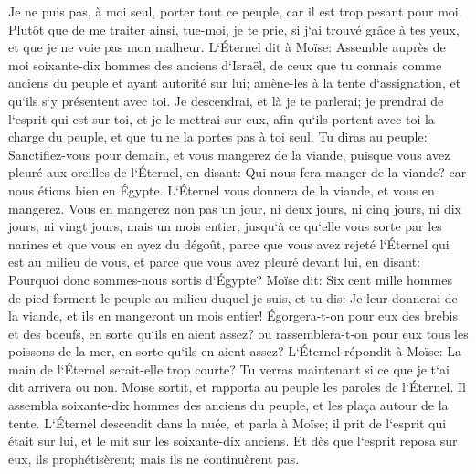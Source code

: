 \verse Je ne puis pas, à moi seul, porter tout ce peuple, car il est trop pesant pour moi. 
\verse Plutôt que de me traiter ainsi, tue-moi, je te prie, si j`ai trouvé grâce à tes yeux, et que je ne voie pas mon malheur. 
\verse L`Éternel dit à Moïse: Assemble auprès de moi soixante-dix hommes des anciens d`Israël, de ceux que tu connais comme anciens du peuple et ayant autorité sur lui; amène-les à la tente d`assignation, et qu`ils s`y présentent avec toi. 
\verse Je descendrai, et là je te parlerai; je prendrai de l`esprit qui est sur toi, et je le mettrai sur eux, afin qu`ils portent avec toi la charge du peuple, et que tu ne la portes pas à toi seul. 
\verse Tu diras au peuple: Sanctifiez-vous pour demain, et vous mangerez de la viande, puisque vous avez pleuré aux oreilles de l`Éternel, en disant: Qui nous fera manger de la viande? car nous étions bien en Égypte. L`Éternel vous donnera de la viande, et vous en mangerez. 
\verse Vous en mangerez non pas un jour, ni deux jours, ni cinq jours, ni dix jours, ni vingt jours, 
\verse mais un mois entier, jusqu`à ce qu`elle vous sorte par les narines et que vous en ayez du dégoût, parce que vous avez rejeté l`Éternel qui est au milieu de vous, et parce que vous avez pleuré devant lui, en disant: Pourquoi donc sommes-nous sortis d`Égypte? 
\verse Moïse dit: Six cent mille hommes de pied forment le peuple au milieu duquel je suis, et tu dis: Je leur donnerai de la viande, et ils en mangeront un mois entier! 
\verse Égorgera-t-on pour eux des brebis et des boeufs, en sorte qu`ils en aient assez? ou rassemblera-t-on pour eux tous les poissons de la mer, en sorte qu`ils en aient assez? 
\verse L`Éternel répondit à Moïse: La main de l`Éternel serait-elle trop courte? Tu verras maintenant si ce que je t`ai dit arrivera ou non. 
\verse Moïse sortit, et rapporta au peuple les paroles de l`Éternel. Il assembla soixante-dix hommes des anciens du peuple, et les plaça autour de la tente. 
\verse L`Éternel descendit dans la nuée, et parla à Moïse; il prit de l`esprit qui était sur lui, et le mit sur les soixante-dix anciens. Et dès que l`esprit reposa sur eux, ils prophétisèrent; mais ils ne continuèrent pas. 

